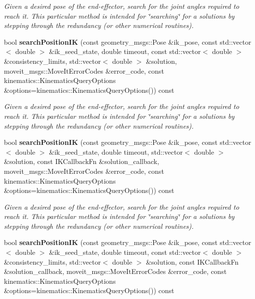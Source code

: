 \begin{DoxyCompactItemize}
\begin{DoxyCompactList}\small\item\em Given a desired pose of the end-\/effector, search for the joint angles required to reach it. This particular method is intended for \char`\"{}searching\char`\"{} for a solutions by stepping through the redundancy (or other numerical routines). \end{DoxyCompactList}\item 
bool {\bf search\-Position\-I\-K} (const geometry\-\_\-msgs\-::\-Pose \&ik\-\_\-pose, const std\-::vector$<$ double $>$ \&ik\-\_\-seed\-\_\-state, double timeout, const std\-::vector$<$ double $>$ \&consistency\-\_\-limits, std\-::vector$<$ double $>$ \&solution, moveit\-\_\-msgs\-::\-Move\-It\-Error\-Codes \&error\-\_\-code, const kinematics\-::\-Kinematics\-Query\-Options \&options=kinematics\-::\-Kinematics\-Query\-Options()) const 
\begin{DoxyCompactList}\small\item\em Given a desired pose of the end-\/effector, search for the joint angles required to reach it. This particular method is intended for \char`\"{}searching\char`\"{} for a solutions by stepping through the redundancy (or other numerical routines). \end{DoxyCompactList}\item 
bool {\bf search\-Position\-I\-K} (const geometry\-\_\-msgs\-::\-Pose \&ik\-\_\-pose, const std\-::vector$<$ double $>$ \&ik\-\_\-seed\-\_\-state, double timeout, std\-::vector$<$ double $>$ \&solution, const I\-K\-Callback\-Fn \&solution\-\_\-callback, moveit\-\_\-msgs\-::\-Move\-It\-Error\-Codes \&error\-\_\-code, const kinematics\-::\-Kinematics\-Query\-Options \&options=kinematics\-::\-Kinematics\-Query\-Options()) const 
\begin{DoxyCompactList}\small\item\em Given a desired pose of the end-\/effector, search for the joint angles required to reach it. This particular method is intended for \char`\"{}searching\char`\"{} for a solutions by stepping through the redundancy (or other numerical routines). \end{DoxyCompactList}\item 
bool {\bf search\-Position\-I\-K} (const geometry\-\_\-msgs\-::\-Pose \&ik\-\_\-pose, const std\-::vector$<$ double $>$ \&ik\-\_\-seed\-\_\-state, double timeout, const std\-::vector$<$ double $>$ \&consistency\-\_\-limits, std\-::vector$<$ double $>$ \&solution, const I\-K\-Callback\-Fn \&solution\-\_\-callback, moveit\-\_\-msgs\-::\-Move\-It\-Error\-Codes \&error\-\_\-code, const kinematics\-::\-Kinematics\-Query\-Options \&options=kinematics\-::\-Kinematics\-Query\-Options()) const 

\end{DoxyCompactItemize}
